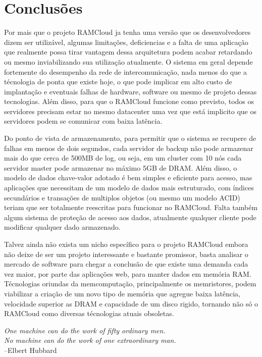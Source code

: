 \chapter{Conclusões}
\label{ch:5}

Por mais que o projeto RAMCloud ja tenha uma versão que os desenvolvedores dizem ser utilizável, algumas limitações, deficiencias e a falta de uma aplicação que
realmente possa tirar vantagem dessa arquitetura podem acabar retardando ou mesmo inviabilizando sua utilização atualmente. O sistema em geral depende fortemente
do desempenho da rede de intercomunicação, nada menos do que a técnologia de ponta que existe hoje, o que pode implicar em alto custo de implantação e eventuais
falhas de hardware, software ou mesmo de projeto dessas tecnologias. Além disso, para que o RAMCloud funcione como previsto, todos os servidores precisam estar
no mesmo datacenter uma vez que está implicito que os servidores podem se comunicar com baixa latência. 
\par
Do ponto de vista de armazenamento, para permitir que o sistema se recupere de falhas em menos de dois segundos, cada servidor de backup não pode armazenar mais 
do que cerca de 500MB de log, ou seja, em um cluster com 10 nós cada servidor master pode armazenar no máximo 5GB de DRAM. Além disso, o modelo de dados chave-valor adotado é bem simples e eficiente para acesso, mas aplicações que necessitam de um modelo de dados mais estruturado, com índices secundários e transações de multiplos objetos (ou mesmo um modelo ACID) teriam que ser totalmente reescritas para funcionar no RAMCloud. Falta também algum sistema de proteção de acesso aos dados, atualmente
qualquer cliente pode modificar qualquer dado armazenado.
\par
Talvez ainda não exista um nicho específico para o projeto RAMCloud embora não deixe de ser um projeto interessante e bastante promissor, basta analisar o mercado de software para chegar a conclusão de que existe uma demanda cada vez maior, por parte das aplicações web, para manter dados em memória RAM. Técnologias oriundas da memcomputação, principalmente os memristores, podem viabilizar a criação de um novo tipo de memória que agregue baixa latência, velocidade superior as DRAM e capacidade de um disco rigido, tornando não só o RAMCloud como diversas técnologias atuais obsoletas.

\vfill
\begin{flushright}
\textit{One machine can do the work of fifty ordinary men. \\
No machine can do the work of one extraordinary man.}\\
--Elbert Hubbard

\end{flushright}
